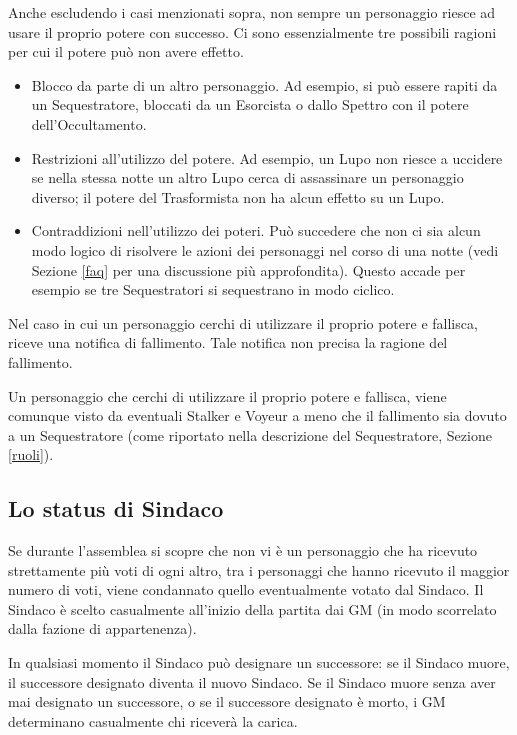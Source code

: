 \documentclass[a4paper,10pt]{article}
\begin{document}
Anche escludendo i casi menzionati sopra, non sempre un personaggio riesce ad
usare il proprio potere con successo.
Ci sono essenzialmente tre possibili ragioni per cui il potere può non avere
effetto.
\begin{itemize}
 \item Blocco da parte di un altro personaggio. Ad esempio, si può essere rapiti
da un Sequestratore, bloccati da un Esorcista o dallo Spettro con il potere
dell'Occultamento.
 \item Restrizioni all'utilizzo del potere. Ad esempio, un Lupo non riesce a
uccidere se nella stessa notte un altro Lupo cerca di assassinare un personaggio
diverso; il potere del Trasformista non ha alcun effetto su un Lupo.
 \item Contraddizioni nell'utilizzo dei poteri. Può succedere che non ci sia
alcun modo logico di risolvere le azioni dei personaggi nel corso di una notte
(vedi Sezione \ref{faq} per una discussione più approfondita). Questo accade per
esempio se tre Sequestratori si sequestrano in modo ciclico.
\end{itemize}
Nel caso in cui un personaggio cerchi di utilizzare il proprio potere e
fallisca, riceve una notifica di fallimento. Tale notifica non precisa la
ragione del fallimento.

Un personaggio che cerchi di utilizzare il proprio potere e fallisca, viene comunque
visto da eventuali Stalker e Voyeur a meno che il fallimento sia dovuto a un Sequestratore
(come riportato nella descrizione del Sequestratore, Sezione \ref{ruoli}).

\subsection{Lo status di Sindaco}
\label{sindaco}

Se durante l'assemblea si scopre che non vi è un personaggio che ha ricevuto
strettamente più voti di ogni altro, tra i personaggi che hanno ricevuto il
maggior numero di voti, viene condannato quello eventualmente votato dal
Sindaco.
Il Sindaco è scelto casualmente all'inizio della partita dai GM (in modo
scorrelato dalla fazione di appartenenza).

In qualsiasi momento il Sindaco può designare un successore: se il Sindaco
muore, il successore designato diventa il nuovo Sindaco. Se il Sindaco muore
senza aver mai designato un successore, o se il successore designato è morto, i
GM determinano casualmente chi riceverà la carica.
\end{document}
